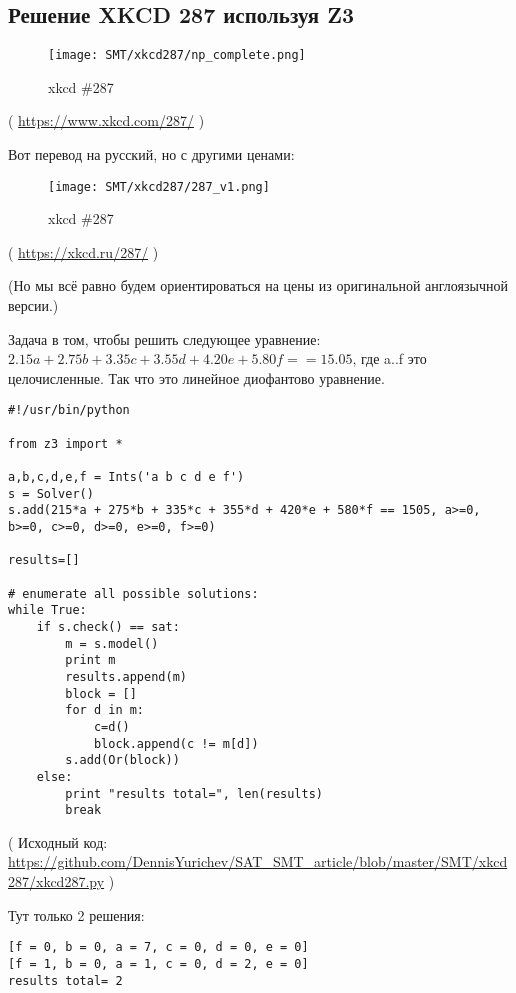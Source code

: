 \subsection{Решение XKCD 287 используя Z3}
\label{XkcdILP}

\begin{figure}[H]
\centering
\texttt{[image: SMT/xkcd287/np\_complete.png]}
\caption{xkcd \#287}
\end{figure}

( \url{https://www.xkcd.com/287/} )

Вот перевод на русский, но с другими ценами:

\begin{figure}[H]
\centering
\texttt{[image: SMT/xkcd287/287\_v1.png]}
\caption{xkcd \#287}
\end{figure}

( \url{https://xkcd.ru/287/} )

(Но мы всё равно будем ориентироваться на цены из оригинальной англоязычной версии.)

Задача в том, чтобы решить следующее уравнение:
$2.15a + 2.75b + 3.35c + 3.55d + 4.20e + 5.80f == 15.05$,
где a..f это целочисленные.
Так что это линейное диофантово уравнение.

\begin{lstlisting}
#!/usr/bin/python

from z3 import *

a,b,c,d,e,f = Ints('a b c d e f')
s = Solver()
s.add(215*a + 275*b + 335*c + 355*d + 420*e + 580*f == 1505, a>=0, b>=0, c>=0, d>=0, e>=0, f>=0)

results=[]

# enumerate all possible solutions:
while True:
    if s.check() == sat:
        m = s.model()
        print m
        results.append(m)
        block = []
        for d in m:
            c=d()
            block.append(c != m[d])
        s.add(Or(block))
    else:
        print "results total=", len(results)
        break
\end{lstlisting}

( Исходный код: \url{https://github.com/DennisYurichev/SAT_SMT_article/blob/master/SMT/xkcd287/xkcd287.py} )

Тут только 2 решения:

\begin{lstlisting}
[f = 0, b = 0, a = 7, c = 0, d = 0, e = 0]
[f = 1, b = 0, a = 1, c = 0, d = 2, e = 0]
results total= 2
\end{lstlisting}

